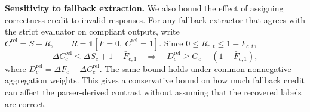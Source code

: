 \documentclass{article}
\begin{document}
\noindent\textbf{Sensitivity to fallback extraction.}
We also bound the effect of assigning correctness credit to invalid responses. For any fallback extractor that agrees with the strict evaluator on compliant outputs, write
$
C^{\mathrm{rel}}=S+R,
\qquad
R=\mathbb{1}[F=0,\ C^{\mathrm{rel}}=1].
$
Since \(0\leq\bar R_{c,t}\leq1-\bar F_{c,t}\),
\begin{equation}
\Delta C^{\mathrm{rel}}_c
\leq
\Delta S_c+1-\bar F_{c,1}
\quad\Longrightarrow\quad
D^{\mathrm{rel}}_c
\geq
G_c-\left(1-\bar F_{c,1}\right),
\label{eq:leniency}
\end{equation}
where \(D^{\mathrm{rel}}_c=\Delta F_c-\Delta C^{\mathrm{rel}}_c\). The same bound holds under common nonnegative aggregation weights. This gives a conservative bound on how much fallback credit can affect the parser-derived contrast without assuming that the recovered labels are correct.

\vspace{-2mm}
\end{document}

